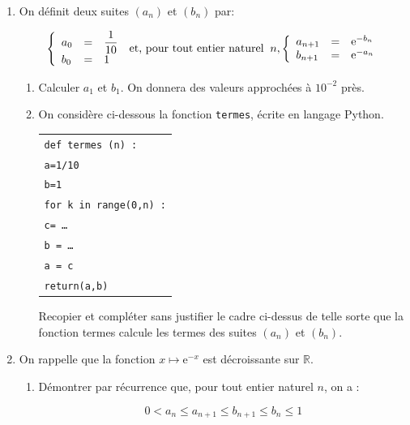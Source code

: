 \documentclass[10pt]{article}
\providecommand{\R}{\mathbb{R}}
\begin{document}
\begin{enumerate}
\item On définit deux suites $\left(a_n\right)$ et $\left(b_n\right)$ par:

\[\left\{\begin{array}{l c l}
a_0& =& \dfrac{1}{10}\\
b_0& =& 1
\end{array}\right.\: \text{et, pour tout entier naturel }\: n,\left\{\begin{array}{l c l}
a_{n+1}&=&\text{e}^{-b_n}\\
b_{n+1}&=&\text{e}^{-a_n}
\end{array}\right.\]

	\begin{enumerate}
		\item Calculer $a_1$ et $b_1$. On donnera des valeurs approchées à $10^{-2}$ près.
		\item On considère ci-dessous la fonction \texttt{termes}, écrite en langage Python.
		
\begin{center}

\begin{tabular}{|l|}\hline
\texttt{def termes (n) :}\\
\quad \texttt{a=1/10}\\
\quad \texttt{b=1}\\
\quad \texttt{for k in range(0,n) :}\\
\qquad \texttt{c= \ldots}\\
\qquad \texttt{b  = \ldots}\\
\qquad \texttt{a = c}\\
\quad \texttt{return(a,b)}\\ \hline
\end{tabular}
\end{center}

Recopier et compléter sans justifier le cadre ci-dessus de telle sorte que la fonction termes calcule les termes des suites $\left(a_n\right)$ et $\left(b_n\right)$.
	\end{enumerate}
\item On rappelle que la fonction $x \longmapsto \text{e}^{-x}$ est décroissante sur $\R$.
	\begin{enumerate}
		\item Démontrer par récurrence que, pour tout entier naturel $n$, on a :
		
		\[0 < a_n \leqslant a_{n+1} \leqslant b_{n+1} \leqslant b_n \leqslant 1\]
		

\end{enumerate}
\end{enumerate}
\end{document}
